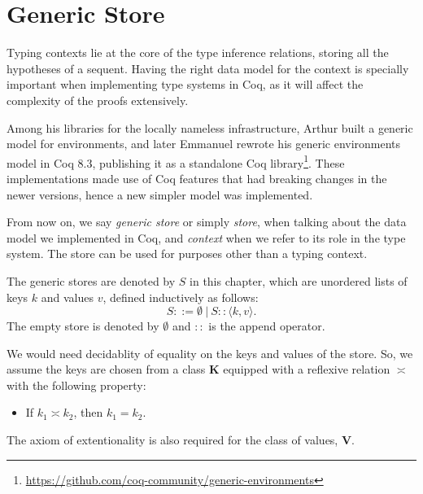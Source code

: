 \section{Generic Store}\label{chap:generic-store}

\newcommand{\angkv}{\langle k, v \rangle}
\newcommand{\angkvp}{\langle k', v' \rangle}

Typing contexts lie at the core of the type inference relations, storing all the hypotheses of a sequent. Having the right data model for the context is specially important when implementing type systems in Coq, as it will affect the complexity of the proofs extensively.

Among his libraries for the locally nameless infrastructure, Arthur \cite{DBLP:journals/jar/Chargueraud12} built a generic model for environments, and later Emmanuel \cite{DBLP:journals/corr/abs-1112-1316} rewrote his generic environments model in Coq 8.3, publishing it as a standalone Coq library\footnote{\url{https://github.com/coq-community/generic-environments}}.
These implementations made use of Coq features that had breaking changes in the newer versions, hence a new simpler model was implemented.


From now on, we say \textit{generic store} or simply \textit{store}, when talking about the data model we implemented in Coq, and \textit{context} when we refer to its role in the type system. The store can be used for purposes other than a typing context.

\begin{definition}
The generic stores are denoted by $S$ in this chapter, which are unordered lists of keys $k$ and values $v$, defined inductively as follows:
\begin{equation*}
S ::= \emptyset~|~S :: \angkv.
\end{equation*}
The empty store is denoted by $\emptyset$ and $::$ is the append operator.
\end{definition}

We would need decidablity of equality on the keys and values of the store. So, we assume the keys are chosen from a class $\mathbf{K}$ equipped with a reflexive relation $\asymp$ with the following property:
\begin{itemize}
    \item If $k_1 \asymp k_2$, then $k_1 = k_2$.
\end{itemize}
The axiom of extentionality is also required for the class of values, $\mathbf{V}$.

